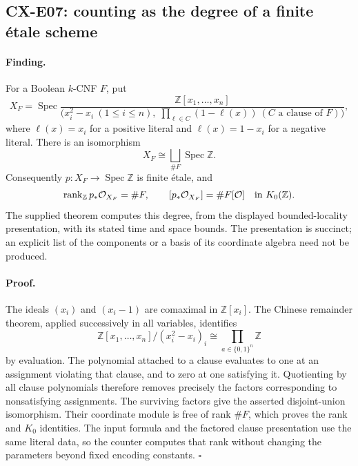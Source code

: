 \subsection{CX-E07: counting as the degree of a finite étale scheme}
\label{finding:CX-E07}

\paragraph{Finding.}
For a Boolean \(k\)-CNF \(F\), put
\[
 X_F=\operatorname{Spec}
 \frac{\mathbb Z[x_1,\ldots,x_n]}
 {\bigl(x_i^2-x_i\ (1\leq i\leq n),\;
     \prod_{\ell\in C}(1-\ell(x))\ (C\text{ a clause of }F)\bigr)},
\]
where \(\ell(x)=x_i\) for a positive literal and
\(\ell(x)=1-x_i\) for a negative literal.
There is an isomorphism
\[
 X_F\cong\bigsqcup_{\#F}\operatorname{Spec}\mathbb Z.
\]
Consequently \(p:X_F\to\operatorname{Spec}\mathbb Z\) is finite étale,
and
\[
 \operatorname{rank}_{\mathbb Z}p_*\mathcal O_{X_F}=\#F,
 \qquad
 [p_*\mathcal O_{X_F}]=\#F[\mathcal O]\quad\hbox{in }K_0(\mathbb Z).
\]
The supplied theorem computes this degree, from the displayed
bounded-locality presentation, with its stated time and space bounds.
The presentation is succinct; an explicit list of the components or
a basis of its coordinate algebra need not be produced.

\paragraph{Proof.}
The ideals \((x_i)\) and \((x_i-1)\) are comaximal in
\(\mathbb Z[x_i]\).
The Chinese remainder theorem, applied successively in all variables,
identifies
\[
 \mathbb Z[x_1,\ldots,x_n]/(x_i^2-x_i)_i
 \cong\prod_{a\in\{0,1\}^n}\mathbb Z
\]
by evaluation.
The polynomial attached to a clause evaluates to one at an assignment
violating that clause, and to zero at one satisfying it.
Quotienting by all clause polynomials therefore removes precisely
the factors corresponding to nonsatisfying assignments.
The surviving factors give the asserted disjoint-union isomorphism.
Their coordinate module is free of rank \(\#F\), which proves the
rank and \(K_0\) identities.
The input formula and the factored clause presentation use the same
literal data, so the counter computes that rank without changing the
parameters beyond fixed encoding constants.
\hfill\(\square\)

